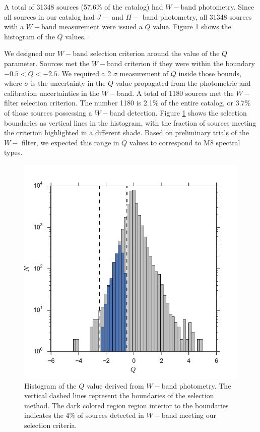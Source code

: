 A total of 31348 sources (57.6\% of the catalog) had $W-$band photometry.  Since all sources in our catalog had $J-$ and $H-$ band photometry, all 31348 sources with a $W-$band measurement were issued a $Q$ value.  Figure \ref{fig_Q_value_histogram} shows the histogram of the $Q$ values.

We designed our $W-$band selection criterion around the value of the $Q$ parameter. Sources met the $W-$band criterion if they were within the boundary $-0.5<Q<-2.5$.  We required a 2 $\sigma$ measurement of $Q$ inside those bounds, where $\sigma$ is the uncertainty in the $Q$ value propagated from the photometric and calibration uncertainties in the $W-$band.  A total of 1180 sources met the $W-$filter selection criterion.  The number 1180 is 2.1\% of the entire catalog, or 3.7\% of those sources possessing a $W-$band detection.  Figure \ref{fig_Q_value_histogram} shows the selection boundaries as vertical lines in the histogram, with the fraction of sources meeting the criterion highlighted in a different shade.  Based on preliminary trials of the $W-$ filter, we expected this range in $Q$ values to correspond to M8 spectral types.

\begin{figure}[ht!]
	\caption{Histogram of the $Q$ value derived from $W-$band photometry.  The vertical dashed lines represent the boundaries of the selection method.  The dark colored region region interior to the boundaries indicates the 4\% of sources detected in $W-$band meeting our selection criteria.  \label{fig_Q_value_histogram}}
\centering
\includegraphics[scale=0.6]{chIMACS/figures/W_phot_sel_mgs}
\end{figure}

